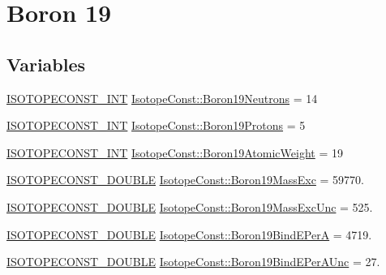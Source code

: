 \hypertarget{group___isotope_const-_boron-_b19}{}\section{Boron 19}
\label{group___isotope_const-_boron-_b19}
\subsection*{Variables}
\begin{DoxyCompactItemize}
\item 
\mbox{\hyperlink{group___isotope_const-_macros_ga5f18360b3e99483a35c32d789e62621c}{I\+S\+O\+T\+O\+P\+E\+C\+O\+N\+S\+T\+\_\+\+I\+NT}} \mbox{\hyperlink{group___isotope_const-_boron-_b19_gaeaf6429da9c01dfa299c1cb140fec7c6}{Isotope\+Const\+::\+Boron19\+Neutrons}} = 14
\item 
\mbox{\hyperlink{group___isotope_const-_macros_ga5f18360b3e99483a35c32d789e62621c}{I\+S\+O\+T\+O\+P\+E\+C\+O\+N\+S\+T\+\_\+\+I\+NT}} \mbox{\hyperlink{group___isotope_const-_boron-_b19_gadcb62419ae22a01945d42eb51a449401}{Isotope\+Const\+::\+Boron19\+Protons}} = 5
\item 
\mbox{\hyperlink{group___isotope_const-_macros_ga5f18360b3e99483a35c32d789e62621c}{I\+S\+O\+T\+O\+P\+E\+C\+O\+N\+S\+T\+\_\+\+I\+NT}} \mbox{\hyperlink{group___isotope_const-_boron-_b19_ga7289d24d5b59664534294a258ca83d09}{Isotope\+Const\+::\+Boron19\+Atomic\+Weight}} = 19
\item 
\mbox{\hyperlink{group___isotope_const-_macros_ga8f45a7272ce02c0b4c65c44636ed719a}{I\+S\+O\+T\+O\+P\+E\+C\+O\+N\+S\+T\+\_\+\+D\+O\+U\+B\+LE}} \mbox{\hyperlink{group___isotope_const-_boron-_b19_ga54442a88c59c3af6faaa1c56295a3d31}{Isotope\+Const\+::\+Boron19\+Mass\+Exc}} = 59770.
\item 
\mbox{\hyperlink{group___isotope_const-_macros_ga8f45a7272ce02c0b4c65c44636ed719a}{I\+S\+O\+T\+O\+P\+E\+C\+O\+N\+S\+T\+\_\+\+D\+O\+U\+B\+LE}} \mbox{\hyperlink{group___isotope_const-_boron-_b19_ga0c374caa0fafb74e074aa2a99d7b4e07}{Isotope\+Const\+::\+Boron19\+Mass\+Exc\+Unc}} = 525.
\item 
\mbox{\hyperlink{group___isotope_const-_macros_ga8f45a7272ce02c0b4c65c44636ed719a}{I\+S\+O\+T\+O\+P\+E\+C\+O\+N\+S\+T\+\_\+\+D\+O\+U\+B\+LE}} \mbox{\hyperlink{group___isotope_const-_boron-_b19_gaf437f8e384bcccde59b3bca467f81121}{Isotope\+Const\+::\+Boron19\+Bind\+E\+PerA}} = 4719.
\item 
\mbox{\hyperlink{group___isotope_const-_macros_ga8f45a7272ce02c0b4c65c44636ed719a}{I\+S\+O\+T\+O\+P\+E\+C\+O\+N\+S\+T\+\_\+\+D\+O\+U\+B\+LE}} \mbox{\hyperlink{group___isotope_const-_boron-_b19_ga57b0cc3806db515beaf36dedb1c44c64}{Isotope\+Const\+::\+Boron19\+Bind\+E\+Per\+A\+Unc}} = 27.

\end{DoxyCompactItemize}
